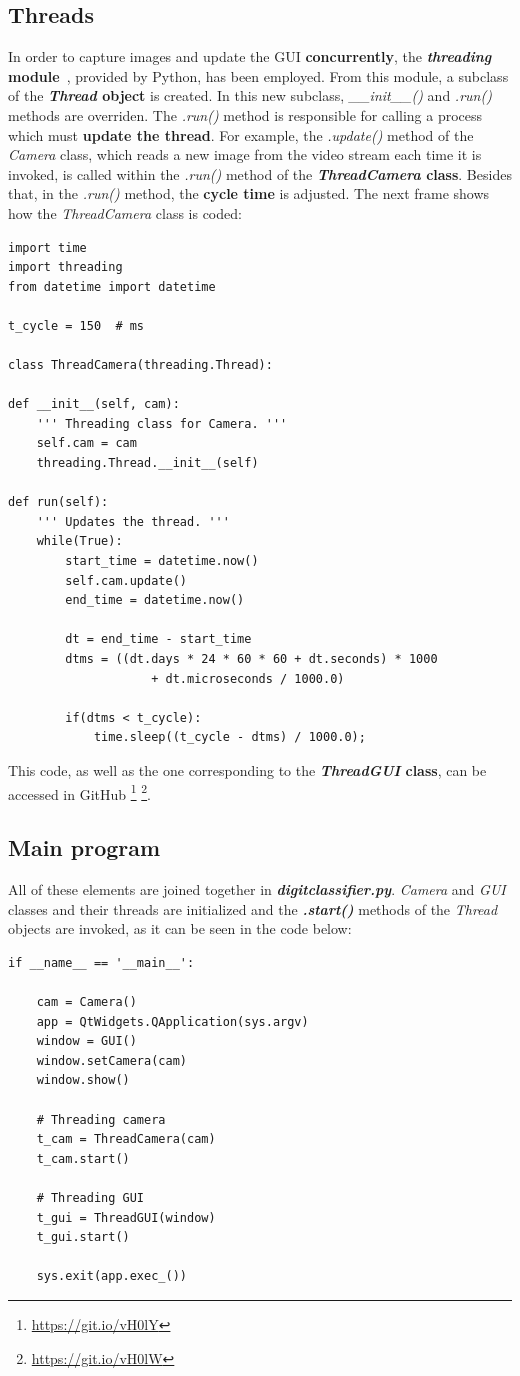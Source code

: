 \subsection{Threads} 
In order to capture images and update the GUI \textbf{concurrently}, the \textbf{\textit{threading} module}~\cite{threading}, provided by Python, has been employed. From this module, a subclass of the \textbf{\textit{Thread} object} is created. In this new subclass, \textit{\_\_init\_\_()} and \textit{.run()} methods are overriden. The \textit{.run()} method is responsible for calling a process which must \textbf{update the thread}. For example, the \textit{.update()} method of the \textit{Camera} class, which reads a new image from the video stream each time it is invoked, is called within the \textit{.run()} method of the \textbf{\textit{ThreadCamera} class}. Besides that, in the \textit{.run()} method, the \textbf{cycle time} is adjusted. The next frame shows how the \textit{ThreadCamera} class is coded:
\begin{lstlisting}
import time
import threading
from datetime import datetime

t_cycle = 150  # ms

class ThreadCamera(threading.Thread):

def __init__(self, cam):
	''' Threading class for Camera. '''
	self.cam = cam
	threading.Thread.__init__(self)

def run(self):
	''' Updates the thread. '''
	while(True):
		start_time = datetime.now()
		self.cam.update()
		end_time = datetime.now()
		
		dt = end_time - start_time
		dtms = ((dt.days * 24 * 60 * 60 + dt.seconds) * 1000
					+ dt.microseconds / 1000.0)
		
		if(dtms < t_cycle):
			time.sleep((t_cycle - dtms) / 1000.0);
\end{lstlisting}
This code, as well as the one corresponding to the \textbf{\textit{ThreadGUI} class}, can be accessed in GitHub \footnote{\url{https://git.io/vH0lY}} \footnote{\url{https://git.io/vH0lW}}.

\subsection{Main program}
All of these elements are joined together in \textbf{\textit{digitclassifier.py}}. \textit{Camera} and \textit{GUI} classes and their threads are initialized and the \textbf{\textit{.start()}} methods of the \textit{Thread} objects are invoked, as it can be seen in the code below:
\begin{lstlisting}
if __name__ == '__main__':

	cam = Camera()
	app = QtWidgets.QApplication(sys.argv)
	window = GUI()
	window.setCamera(cam)
	window.show()
	
	# Threading camera
	t_cam = ThreadCamera(cam)
	t_cam.start()
	
	# Threading GUI
	t_gui = ThreadGUI(window)
	t_gui.start()
	
	sys.exit(app.exec_())
\end{lstlisting}

